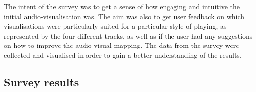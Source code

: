 \documentclass[../initial_thesis.tex]{subfiles}
\begin{document}


The intent of the survey was to get a sense of how engaging and intuitive the initial audio-visualisation was. The aim was also to get user feedback on which visualisations were particularly suited for a particular style of playing, as represented by the four different tracks, as well as if the user had any suggestions on how to improve the audio-visual mapping. The data from the survey were collected and visualised in order to gain a better understanding of the results.

\subsection{Survey results}
\end{document}
